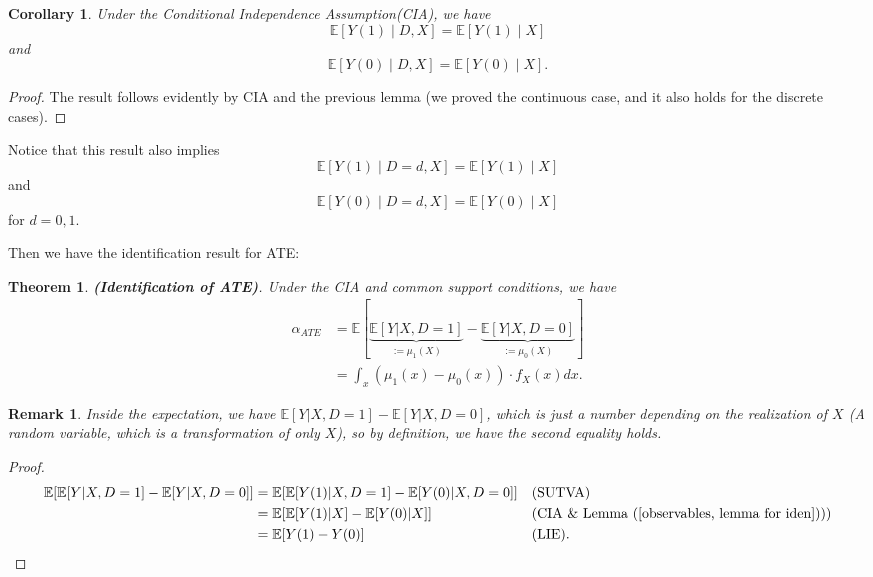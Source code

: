 \documentclass[11pt,a4paper]{amsart}
\theoremstyle{plain}
\newtheorem{theorem}{Theorem}
\newtheorem{corollary}{Corollary}
\newtheorem*{remark*}{Remark}
\theoremstyle{definition}
\begin{document}
	\begin{corollary}
		Under the Conditional Independence Assumption(CIA), we have 
		\[	\mathbb{E}[Y(1) \mid D,X] = \mathbb{E}[Y(1) \mid X]	\]
		and
		\[	\mathbb{E}[Y(0) \mid D,X] = \mathbb{E}[Y(0) \mid X].	\]
	\end{corollary}
	\begin{proof}
		The result follows evidently by CIA and the previous lemma (we proved the continuous case, and it also holds for the discrete cases).
	\end{proof}
	Notice that this result also implies 
		\[	\mathbb{E}[Y(1) \mid D=d,X] = \mathbb{E}[Y(1) \mid X]	\]
	and
	\[	\mathbb{E}[Y(0) \mid D=d,X] = \mathbb{E}[Y(0) \mid X]	\]
	for $d=0,1$.\par 
	Then we have the identification result for ATE:
	\begin{theorem}
		\textbf{(Identiﬁcation of ATE)}. Under the CIA and common support conditions, we have 
		\[	 \begin{aligned}
				\alpha_{A T E} &= \mathbb{E}[\underbrace{\mathbb{E}[Y|X,D=1]}_{:= \mu_{1}(X)} - \underbrace{\mathbb{E}[Y|X,D=0]}_{:= \mu_{0}(X)} ] \\
				&= \int_{x} (\mu_{1}(x)-\mu_{0}(x)) \cdot f_{X}(x)dx.
		\end{aligned}	\]
	\end{theorem}
	
	\begin{remark*}
		Inside the expectation, we have $\mathbb{E}[Y|X,D=1] - \mathbb{E}[Y|X,D=0]$, which is just a number depending on the realization of $X$ (A random variable, which is a transformation of only $X$), so by definition, we have the second equality holds.
	\end{remark*}
	
	\begin{proof}
		\[	\begin{aligned}
		\mathbb{E}[\mathbb{E}[Y|X,D=1] - \mathbb{E}[Y|X,D=0]] &= \mathbb{E}[\mathbb{E}[Y(1)|X,D=1] - \mathbb{E}[Y(0)|X,D=0]] &&\text{(SUTVA)}	\\
		&= \mathbb{E}[\mathbb{E}[Y(1)|X] - \mathbb{E}[Y(0)|X]] &&\text{(CIA \& Lemma (\ref{observables, lemma for iden})))}	\\
		&= \mathbb{E}[Y(1)-Y(0)] &&\text{(LIE)}.
		\end{aligned}	\]
	\end{proof}
	
\end{document}
